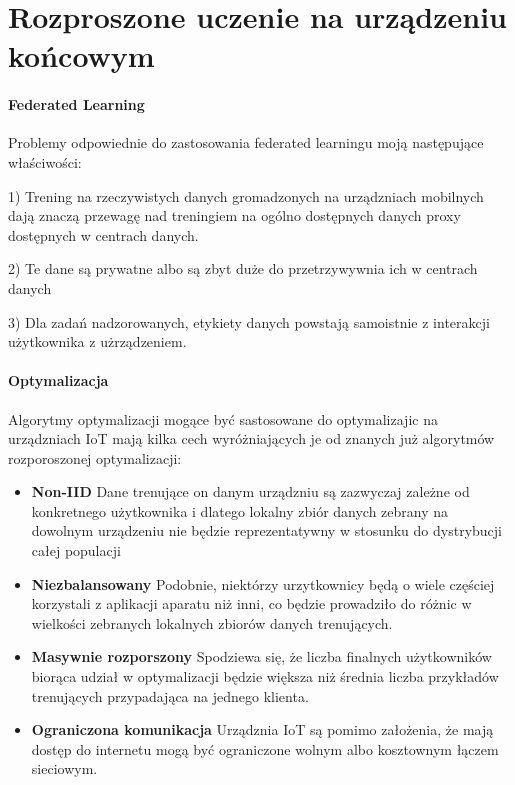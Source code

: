 \newpage
\section{Rozproszone uczenie na urządzeniu końcowym}


\paragraph{Federated Learning}

Problemy odpowiednie do zastosowania federated learningu moją następujące właściwości:

1) Trening na rzeczywistych danych gromadzonych na urządzniach mobilnych dają znaczą przewagę
nad treningiem na ogólno dostępnych danych proxy dostępnych w centrach danych.

2) Te dane są prywatne albo są zbyt duże do przetrzywywnia ich w centrach danych

3) Dla zadań nadzorowanych, etykiety danych powstają samoistnie z interakcji użytkownika z użrządzeniem.



\paragraph{Optymalizacja}

Algorytmy optymalizacji mogące być sastosowane do optymalizajic na urządzniach IoT mają kilka cech wyróżniających je od znanych już algorytmów rozporoszonej optymalizacji:
\begin{itemize}

\item \textbf{Non-IID} Dane trenujące on danym urządzniu są zazwyczaj zależne od konkretnego użytkownika i dlatego lokalny zbiór danych zebrany na dowolnym urządzeniu nie będzie reprezentatywny w stosunku do dystrybucji całej populacji
\item \textbf{Niezbalansowany} Podobnie, niektórzy urzytkownicy będą o wiele częściej korzystali z aplikacji aparatu niż inni, co będzie prowadziło do różnic w wielkości zebranych lokalnych zbiorów  danych trenujących.
\item \textbf{Masywnie rozporszony} Spodziewa się, że liczba finalnych użytkowników biorąca udział w optymalizacji będzie większa niż średnia liczba przykładów trenujących przypadająca na jednego klienta.
\item \textbf{Ograniczona komunikacja} Urządznia IoT są pomimo założenia, że mają dostęp do
internetu mogą być ograniczone wolnym albo kosztownym łączem sieciowym.
\end{itemize}

